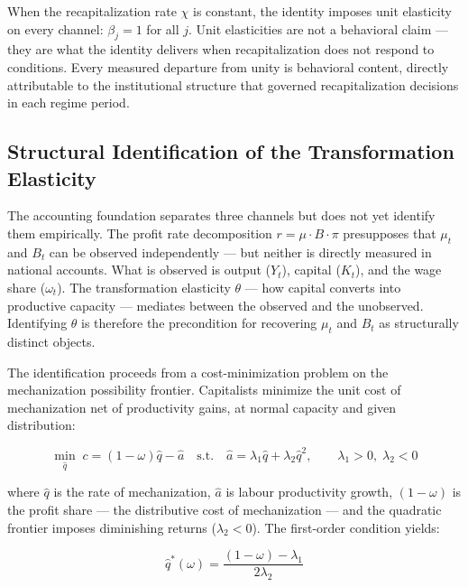 \documentclass[11pt,a4paper]{article}
\begin{document}
{When the recapitalization rate $\chi$ is constant, the identity
imposes unit elasticity on every channel: $\beta_j = 1$ for all $j$.
Unit elasticities are not a behavioral claim --- they are what the
identity delivers when recapitalization does not respond to
conditions. Every measured departure from unity is behavioral content,
directly attributable to the institutional structure that governed
recapitalization decisions in each regime period. 

\subsection{Structural Identification of the Transformation Elasticity}
\label{sec:theta_identification}

The accounting foundation separates three channels but does not yet
identify them empirically. The profit rate decomposition $r = \mu
\cdot B \cdot \pi$ presupposes that $\mu_t$ and $B_t$ can be
observed independently --- but neither is directly measured in
national accounts. What is observed is output ($Y_t$), capital
($K_t$), and the wage share ($\omega_t$). The transformation
elasticity $\theta$ --- how capital converts into productive
capacity --- mediates between the observed and the unobserved.
Identifying $\theta$ is therefore the precondition for recovering
$\mu_t$ and $B_t$ as structurally distinct objects.

The identification proceeds from a cost-minimization problem on the
mechanization possibility frontier. Capitalists minimize the unit
cost of mechanization net of productivity gains, at normal capacity
and given distribution:

\begin{equation}
	\min_{\hat{q}} \; c = (1-\omega)\hat{q} - \hat{a}
	\quad \text{s.t.} \quad
	\hat{a} = \lambda_1 \hat{q} + \lambda_2 \hat{q}^2,
	\qquad \lambda_1 > 0, \; \lambda_2 < 0
	\label{eq:cost_min}
\end{equation}

where $\hat{q}$ is the rate of mechanization, $\hat{a}$ is labour
productivity growth, $(1-\omega)$ is the profit share --- the
distributive cost of mechanization --- and the quadratic frontier
imposes diminishing returns ($\lambda_2 < 0$). The first-order
condition yields:

\begin{equation}
	\hat{q}^*(\omega) = \frac{(1-\omega) - \lambda_1}{2\lambda_2}
	\label{eq:foc_qstar}
\end{equation}

}
\end{document}
